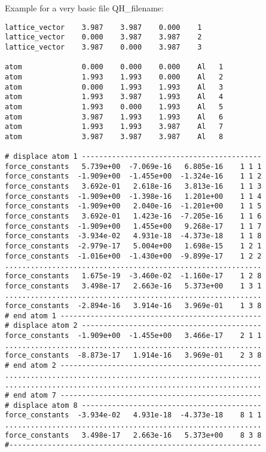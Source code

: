 Example for a very basic file QH\_filename:
\begin{verbatim}
lattice_vector    3.987    3.987    0.000    1
lattice_vector    0.000    3.987    3.987    2
lattice_vector    3.987    0.000    3.987    3

atom              0.000    0.000    0.000    Al   1
atom              1.993    1.993    0.000    Al   2
atom              0.000    1.993    1.993    Al   3
atom              1.993    3.987    1.993    Al   4
atom              1.993    0.000    1.993    Al   5
atom              3.987    1.993    1.993    Al   6
atom              1.993    1.993    3.987    Al   7
atom              3.987    3.987    3.987    Al   8

# displace atom 1 ------------------------------------------
force_constants   5.739e+00  -7.069e-16   6.805e-16    1 1 1
force_constants  -1.909e+00  -1.455e+00  -1.324e-16    1 1 2
force_constants   3.692e-01   2.618e-16   3.813e-16    1 1 3
force_constants  -1.909e+00  -1.398e-16   1.201e+00    1 1 4
force_constants  -1.909e+00   2.040e-16  -1.201e+00    1 1 5
force_constants   3.692e-01   1.423e-16  -7.205e-16    1 1 6
force_constants  -1.909e+00   1.455e+00   9.268e-17    1 1 7
force_constants  -3.934e-02   4.931e-18  -4.373e-18    1 1 8
force_constants  -2.979e-17   5.004e+00   1.698e-15    1 2 1
force_constants  -1.016e+00  -1.430e+00  -9.899e-17    1 2 2
............................................................
force_constants   1.675e-19  -3.460e-02  -1.160e-17    1 2 8
force_constants   3.498e-17   2.663e-16   5.373e+00    1 3 1
............................................................
force_constants  -2.894e-16   3.914e-16   3.969e-01    1 3 8
# end atom 1 -----------------------------------------------
# displace atom 2 ------------------------------------------
force_constants  -1.909e+00  -1.455e+00   3.466e-17    2 1 1 
............................................................
force_constants  -8.873e-17   1.914e-16   3.969e-01    2 3 8 
# end atom 2 -----------------------------------------------
............................................................
............................................................
# end atom 7 -----------------------------------------------
# displace atom 8 ------------------------------------------
force_constants  -3.934e-02   4.931e-18  -4.373e-18    8 1 1
............................................................
force_constants   3.498e-17   2.663e-16   5.373e+00    8 3 8
#-----------------------------------------------------------
\end{verbatim}








